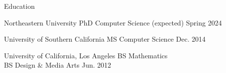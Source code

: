 \documentclass[]{cv}
\begin{document}
\resumeheader
{}
{}
{}
{}

\begin{section}{Education}
    \begin{subsectionnobullet}
        {Northeastern University}
        {PhD Computer Science}
        {(expected) Spring 2024}
    \end{subsectionnobullet}
    
    \begin{subsectionnobullet}
        {University of Southern California}
        {MS Computer Science}
        {Dec. 2014}
    \end{subsectionnobullet}

    \begin{subsectionnobullet}
        {University of California, Los Angeles}
        {BS Mathematics\\ BS Design \& Media Arts}
        {Jun. 2012}
    \end{subsectionnobullet}
\end{section}
\end{document}
